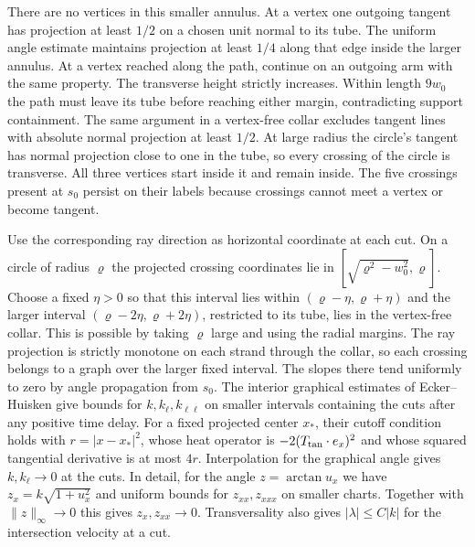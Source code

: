 There are no vertices in this smaller annulus. At a vertex one
outgoing tangent has projection at least \(1/2\) on a chosen unit
normal to its tube. The uniform angle estimate maintains projection
at least \(1/4\) along that edge inside the larger annulus. At a vertex
reached along the path, continue on an outgoing arm with the same
property. The transverse height strictly increases. Within length
\(9w_0\) the path must leave its tube before reaching either margin,
contradicting support containment. The same argument in a vertex-free
collar excludes tangent lines with absolute normal projection at
least \(1/2\). At large radius the circle's tangent has normal
projection close to one in the tube, so every crossing of the
circle is transverse. All three vertices start inside it and remain
inside. The five crossings present at \(s_0\) persist on their
labels because crossings cannot meet a vertex or become tangent.

Use the corresponding ray direction as horizontal coordinate at
each cut. On a circle of radius \(\varrho\) the projected crossing
coordinates lie in \([\sqrt{\varrho^2-w_0^2},\varrho]\). Choose a
fixed \(\eta>0\) so that this interval lies within
\((\varrho-\eta,\varrho+\eta)\) and the larger interval
\((\varrho-2\eta,\varrho+2\eta)\), restricted to its tube, lies in
the vertex-free collar. This is possible by taking \(\varrho\)
large and using the radial margins. The ray projection is strictly
monotone on each strand through the collar, so each crossing belongs
to a graph over the larger fixed interval. The slopes there tend
uniformly to zero by angle propagation from \(s_0\). The interior
graphical estimates of Ecker--Huisken \cite[Theorems~3.1 and 3.4]{eh}
give bounds for \(k,k_\ell,k_{\ell\ell}\) on smaller intervals
containing the cuts after any positive time delay. For a fixed
projected center \(x_*\), their cutoff condition holds with
\(r=|x-x_*|^2\), whose heat operator is
\(-2(T_{\rm tan}\cdot e_x)^2\) and whose squared tangential derivative
is at most \(4r\). Interpolation for the graphical angle gives
\(k,k_\ell\to0\) at the cuts. In detail, for the angle
\(z=\arctan u_x\) we have \(z_x=k\sqrt{1+u_x^2}\) and uniform
bounds for \(z_{xx},z_{xxx}\) on smaller charts. Together with
\(\|z\|_\infty\to0\) this gives \(z_x,z_{xx}\to0\).
Transversality also gives \(|\lambda|\le C|k|\) for the
intersection velocity at a cut.

